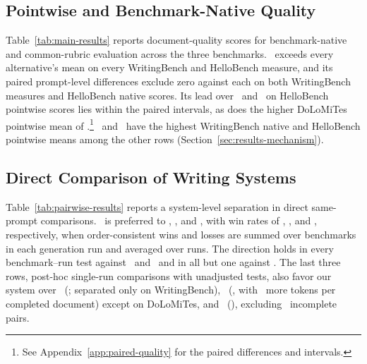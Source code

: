\subsection{Pointwise and Benchmark-Native Quality}
\label{sec:results-pointwise}

Table~\ref{tab:main-results} reports document-quality scores for benchmark-native and common-rubric evaluation across the three benchmarks.
\condAgenticCogWriter\ exceeds every alternative's mean on every WritingBench and HelloBench measure, and its paired prompt-level differences exclude zero against each on both WritingBench measures and HelloBench native scores.
Its lead over \condStaged\ and \condTaskPlanning\ on HelloBench pointwise scores lies within the paired intervals, as does the higher DoLoMiTes pointwise mean of \condStaged.\footnote{See Appendix~\ref{app:paired-quality} for the paired differences and intervals.}
\condSingleWriter\ and \condNoGoals\ have the highest WritingBench native and HelloBench pointwise means among the other rows (Section~\ref{sec:results-mechanism}).



\subsection{Direct Comparison of Writing Systems}
\label{sec:results-effectiveness}

Table~\ref{tab:pairwise-results} reports a system-level separation in direct same-prompt comparisons.
\condAgenticCogWriter\ is preferred to \condSinglePass, \condStaged, and \condTaskPlanning, with win rates of \PooledFourOneRateMean, \PooledFourTwoRateMean, and \PooledFourThreeRateMean, respectively, when order-consistent wins and losses are summed over benchmarks in each generation run and averaged over runs.
The direction holds in every benchmark--run test against \condSinglePass\ and \condTaskPlanning\ and in all but one against \condStaged.
The last three rows, post-hoc single-run comparisons with unadjusted tests, also favor our system over \condPlainAgent\ (\FullPlainAgentAcrossRate; separated only on WritingBench), \condSelfRefine\ (\FullSelfRefineAcrossRate, with \SelfRefineTokenExcess\ more tokens per completed document) except on DoLoMiTes, and \condExploratoryOne\ (\FullCogWriterStyleAcrossRate), excluding \CogWriterStyleExcluded\ incomplete pairs.

